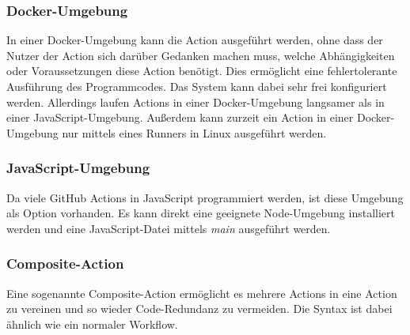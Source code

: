 \subsubsection{Docker-Umgebung}
In einer Docker-Umgebung kann die Action ausgeführt werden, ohne dass der Nutzer der Action sich darüber Gedanken machen muss, welche Abhängigkeiten oder Voraussetzungen diese Action benötigt. Dies ermöglicht eine fehlertolerante Ausführung des Programmcodes. Das System kann dabei sehr frei konfiguriert werden. Allerdings laufen Actions in einer Docker-Umgebung langsamer als in einer JavaScript-Umgebung. Außerdem kann zurzeit ein Action in einer Docker-Umgebung nur mittels eines Runners in Linux ausgeführt werden.

\subsubsection{JavaScript-Umgebung}
Da viele GitHub Actions in JavaScript programmiert werden, ist diese Umgebung als Option vorhanden. Es kann direkt eine geeignete Node-Umgebung installiert werden und eine JavaScript-Datei mittels \textit{main} ausgeführt werden. 

\subsubsection{Composite-Action}
Eine sogenannte Composite-Action ermöglicht es mehrere Actions in eine Action zu vereinen und so wieder Code-Redundanz zu vermeiden. Die Syntax ist dabei ähnlich wie ein normaler Workflow. 
